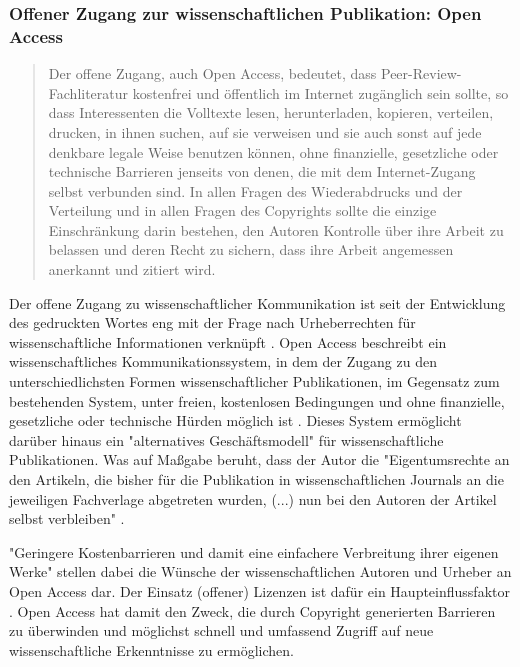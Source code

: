 \subsubsection{Offener Zugang zur wissenschaftlichen Publikation: Open Access}

\begin{quote}
Der offene Zugang, auch Open Access, bedeutet, dass Peer-Review-Fachliteratur kostenfrei und öffentlich im Internet zugänglich sein sollte, so dass Interessenten die Volltexte lesen, herunterladen, kopieren, verteilen, drucken, in ihnen suchen, auf sie verweisen und sie auch sonst auf jede denkbare legale Weise benutzen können, ohne finanzielle, gesetzliche oder technische Barrieren jenseits von denen, die mit dem Internet-Zugang selbst verbunden sind. In allen Fragen des Wiederabdrucks und der Verteilung und in allen Fragen des Copyrights sollte die einzige Einschränkung darin bestehen, den Autoren Kontrolle über ihre Arbeit zu belassen und deren Recht zu sichern, dass ihre Arbeit angemessen anerkannt und zitiert wird.
\end{quote} \cite{boai_2012}

Der offene Zugang zu wissenschaftlicher Kommunikation ist seit der Entwicklung des gedruckten Wortes eng mit der Frage nach Urheberrechten für wissenschaftliche Informationen verknüpft \cite{Case_2000}. Open Access beschreibt ein wissenschaftliches Kommunikationssystem, in dem der Zugang zu den unterschiedlichsten Formen wissenschaftlicher Publikationen, im Gegensatz zum bestehenden System, unter freien, kostenlosen Bedingungen und ohne finanzielle, gesetzliche oder technische Hürden möglich ist \cite{WD_bundestag_2009}. Dieses System ermöglicht darüber hinaus ein "alternatives Geschäftsmodell"\cite{lewis_2012_inevitability} für wissenschaftliche Publikationen. Was auf Maßgabe beruht, dass der Autor die "Eigentumsrechte an den Artikeln, die bisher für die Publikation in wissenschaftlichen Journals an die jeweiligen Fachverlage abgetreten wurden, (...) nun bei den Autoren der Artikel selbst verbleiben" \cite{Hess_2006}.

"Geringere Kostenbarrieren und damit eine einfachere Verbreitung ihrer eigenen Werke" \cite{WD_bundestag_2009} stellen dabei die Wünsche der wissenschaftlichen Autoren und Urheber an Open Access dar. Der Einsatz (offener) Lizenzen ist dafür ein Haupteinflussfaktor \cite{cite:16}. Open Access hat damit den Zweck, die durch Copyright generierten Barrieren zu überwinden und möglichst schnell und umfassend Zugriff auf neue wissenschaftliche Erkenntnisse zu ermöglichen.


